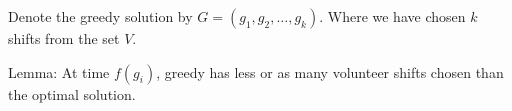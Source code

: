 \begin{soln}
	Denote the greedy solution by \(G = (g_1, g_2, \dots, g_k)\). Where we have chosen \(k\) shifts from the set \(V\).

	Lemma: At time \(f(g_i)\), greedy has less or as many volunteer shifts chosen than the optimal solution.
\end{soln}
